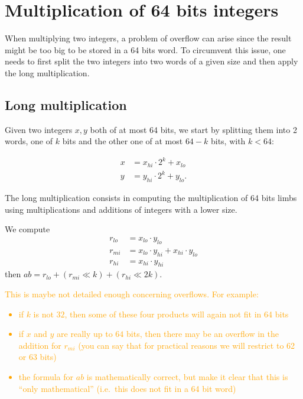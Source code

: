 \documentclass[a4paper]{article}
\begin{document}
\section{Multiplication of 64 bits integers}

When multiplying two integers, a problem of overflow can arise since the result might be too big to be stored in a 64 bits word. 
To circumvent this issue, one needs to first split the two integers into two words of a given size and then apply the long multiplication.

\subsection{Long multiplication}
Given two integers $x,y$ both of at most 64 bits, we start by splitting them into 2 words, one of $k$ bits and the other one of at most $64-k$
bits, with $k<64$:

\begin{align*}
    x &= x_{hi}\cdot 2^{k} + x_{lo} \\
    y &= y_{hi}\cdot 2^{k} + y_{lo}.
\end{align*}

The long multiplication consists in computing the multiplication of 64 bits limbs using multiplications and additions of
integers with a lower size.

We compute
\begin{align*}
    r_{lo} &= x_{lo}\cdot y_{lo} \\
    r_{mi} &= x_{lo}\cdot y_{hi} + x_{hi}\cdot y_{lo} \\
    r_{hi} &= x_{hi}\cdot y_{hi}
\end{align*}
then $ab = r_{lo} + (r_{mi} \ll k) + (r_{hi} \ll 2k)$.

\textcolor{orange}{This is maybe not detailed enough concerning overflows. For
  example:
\begin{itemize}
  \item if \(k\) is not \(32\), then some of these four products will again
    not fit in 64 bits
  \item if \(x\) and \(y\) are really up to \(64\) bits, then there may be an overflow
    in the addition for \(r_{mi}\) (you can say that for practical reasons we will restrict
    to 62 or 63 bits)
  \item the formula for \(ab\) is mathematically correct, but make it clear
    that this is ``only mathematical'' (i.e.\ this does not fit in a 64 bit word)
\end{itemize}}
\end{document}
